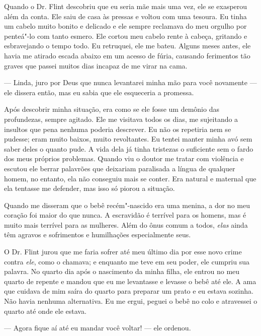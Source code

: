 Quando o Dr. Flint descobriu que eu
seria mãe mais uma vez, ele se exasperou além da conta. Ele saiu de casa
às pressas e voltou com uma tesoura. Eu tinha um cabelo muito bonito e
delicado e ele sempre reclamava do meu orgulho por penteá"-lo com tanto
esmero. Ele cortou meu cabelo rente à cabeça, gritando e esbravejando o
tempo todo. Eu retruquei, ele me bateu. Alguns meses antes, ele havia me
atirado escada abaixo em um acesso de fúria, causando ferimentos tão
graves que passei muitos dias incapaz de me virar na cama.

--- Linda, juro por Deus que nunca levantarei minha mão para você
novamente --- ele dissera então, mas eu sabia que ele esqueceria a
promessa.

Após descobrir minha situação, era como
se ele fosse um demônio das profundezas, sempre agitado. Ele me visitava
todos os dias, me sujeitando a insultos que pena nenhuma poderia
descrever. Eu não os repetiria nem se pudesse; eram muito baixos, muito
revoltantes. Eu tentei manter minha avó sem saber deles o quanto pude. A
vida dela já tinha tristezas o suficiente sem o fardo dos meus próprios
problemas. Quando viu o doutor me tratar com violência e escutou ele
berrar palavrões que deixariam paralisada a língua de qualquer homem, no
entanto, ela não conseguiu mais se conter. Era natural e maternal que
ela tentasse me defender, mas isso só piorou a situação.

Quando me disseram que o bebê
recém"-nascido era uma menina, a dor no meu coração foi maior do que
nunca. A escravidão é terrível para os homens, mas é muito mais terrível
para as mulheres. Além do ônus comum a todos, \emph{elas} ainda têm
agravos e sofrimentos e humilhações especialmente seus.

O Dr. Flint jurou que me faria sofrer
até meu último dia por esse novo crime contra \emph{ele}, como o
chamava; e enquanto me teve em seu poder, ele cumpriu sua palavra. No
quarto dia após o nascimento da minha filha, ele entrou no meu quarto de
repente e mandou que eu me levantasse e levasse o bebê até ele. A ama
que cuidava de mim saíra do quarto para preparar um prato e eu estava
sozinha. Não havia nenhuma alternativa. Eu me ergui, peguei o bebê no
colo e atravessei o quarto até onde ele estava.

--- Agora fique aí até eu mandar você voltar! --- ele ordenou.


